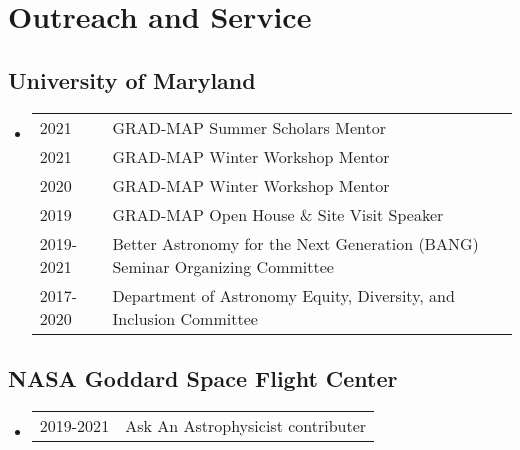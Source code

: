\section*{Outreach and Service}
\subsection*{University of Maryland}
\begin{itemize}
\item \begin{tabular}{ll}
2021			& GRAD-MAP Summer Scholars Mentor \\
2021			& GRAD-MAP Winter Workshop Mentor \\
2020			& GRAD-MAP Winter Workshop Mentor \\
2019			& GRAD-MAP Open House \& Site Visit Speaker \\
2019-2021	& Better Astronomy for the Next Generation (BANG) Seminar Organizing Committee \\
2017-2020 	& Department of Astronomy Equity, Diversity, and Inclusion Committee
\end{tabular}
\end{itemize}
\subsection*{NASA Goddard Space Flight Center}
\begin{itemize}
\item \begin{tabular}{ll}
2019-2021 & Ask An Astrophysicist contributer
\end{tabular}
\end{itemize}





\bigskip



